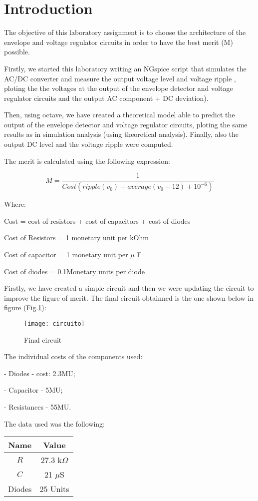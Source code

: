 \section{Introduction}
\label{sec:introduction}

The objective of this laboratory assignment is to choose the architecture of the envelope and voltage regulator circuits in order to have the best merit (M) possible. \par
Firstly, we started this laboratory writing an NGspice script that simulates the AC/DC converter and measure the output voltage level and voltage ripple , ploting the the voltages at the output of the envelope detector and voltage regulator circuits and the output AC component + DC deviation).\par
Then, using octave, we have created a theoretical model able to predict the output of the envelope detector and voltage regulator circuits, ploting the same results as in simulation analysis (using theoretical analysis). Finally, also the output DC level and the voltage ripple were computed. \par

The merit is calculated using the following expression:\par
\begin{equation}
    M = \frac{1}{Cost(ripple(v_0)+average(v_0-12)+10^{-6})}
\end{equation}\par
Where: \par
Cost = cost of resistors + cost of capacitors + cost of diodes \par
Cost of Resistors = 1 monetary unit per kOhm \par
Cost of capacitor = 1 monetary unit per $\mu$ F \par
Cost of diodes = 0.1Monetary units per diode \par
Firstly, we have created a simple circuit and then we were updating the circuit to improve the figure of merit. The final circuit obtainned is the one shown below in figure (Fig.\ref{fig:circuito}): \par

\begin{figure}[H]
\centering
\texttt{[image: circuito]}
\caption{Final circuit}
\label{fig:circuito}
\end{figure}

The individual costs of the components used: \par
- Diodes - cost: 2.3MU; \par
- Capacitor - 5MU; \par
- Resistances - 55MU. \par

The data used was the following:

\begin{center}
  \begin{tabular}{ | c | c | }
    \hline    
    {\bf Name} & {\bf Value} \\ \hline
    $R$ & 27.3 k$\Omega$ \\ \hline 
    $C$ & 21 $\mu$S \\ \hline
    Diodes & 25 Units \\ 
    \hline
  \end{tabular}
\end{center}




